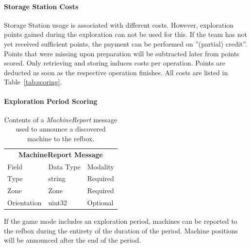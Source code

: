 \documentclass[12pt,twoside]{article}
\newcommand{\reftab}[1]{Table~\ref{#1}}
\begin{document}
\paragraph{Storage Station Costs}
Storage Station usage is associated with different costs.
However, exploration points gained during the exploration can not be
used for this. If the team has not yet received sufficient points,
the payment can be performed on ''(partial) credit''. Points that %
were missing upon preparation will be subtracted later from points scored.
Only retrieving and storing induces costs per operation.
Points are deducted as soon as the respective operation finishes.
All costs are listed in \reftab{tab:scoring}.

\paragraph{Exploration Period Scoring}

\begin{table}[]
  \begin{tabular}{|lll}
  \multicolumn{3}{c}{\textbf{MachineReport Message}}                          \\ 
  \multicolumn{1}{l}{Field}       & \multicolumn{1}{l}{Data Type} & Modality \\ \hline
  \multicolumn{1}{l|}{Type}        & \multicolumn{1}{l|}{string}    & Required \\ \hline
  \multicolumn{1}{l|}{Zone}        & \multicolumn{1}{l|}{Zone}      & Required \\ \hline
  \multicolumn{1}{l|}{Orientation} & \multicolumn{1}{l|}{uint32}    & Optional \\ \hline
  \end{tabular}
  \caption{Contents of a \textit{MachineReport} message used to announce a discovered machine
  to the \ac{refbox}.}
  \label{tab:machine-report}
\end{table}

If the game mode includes an exploration period, machines
can be reported to the \ac{refbox} during the entirety of the duration of the
period. Machine positions will be announced after the end of the period.
\end{document}
